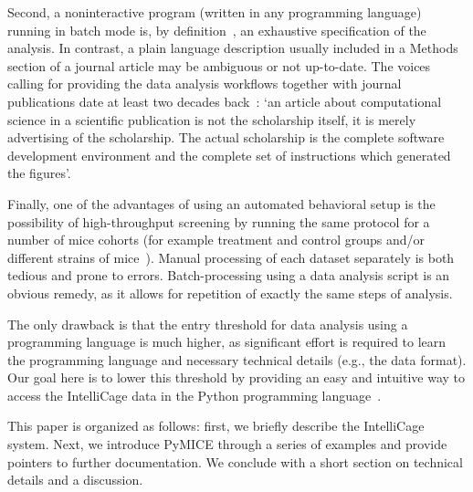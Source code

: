 Second, a noninteractive program (written in any programming language)
running in batch mode is, by
definition~\cite{Hoare69anaxiomatic,Turing1936,Floyd1967Flowcharts,Mccarthy63abasis},
an exhaustive specification of the analysis. In contrast, a plain language
description usually included in a Methods section of a journal article
may be ambiguous or not up-to-date.
The voices calling for providing the data analysis workflows together with
journal publications date at least two decades back~\cite{buckheit1995}:
`an article about computational science in a scientific publication is not
the scholarship itself, it is merely advertising of the scholarship. The
actual scholarship is the complete software development environment and the
complete set of instructions which generated the figures'.

Finally, one of the advantages of using an automated behavioral setup
is the possibility of high-throughput screening
by running the same protocol for a number of mice
cohorts (for example treatment and control groups and/or different strains
of mice~\cite{Puscian:2014cu}). Manual processing of each dataset separately
is both tedious and prone to errors. Batch-processing using a data
analysis script is an obvious remedy, as it allows for repetition of exactly
the same steps of analysis.

The only drawback is that the entry threshold for data analysis using a
programming language is much higher, as significant effort is required to
learn the programming language and necessary technical details (e.g., the data
format).
Our goal here is to lower this threshold by providing an easy and intuitive
way to access the IntelliCage data in the Python programming language~\cite{rossum1995}.

This paper is organized as follows: first, we briefly describe the IntelliCage system.
Next, we introduce PyMICE through a series of examples and provide pointers
to further documentation. We conclude with a short section on technical details and
a discussion.
